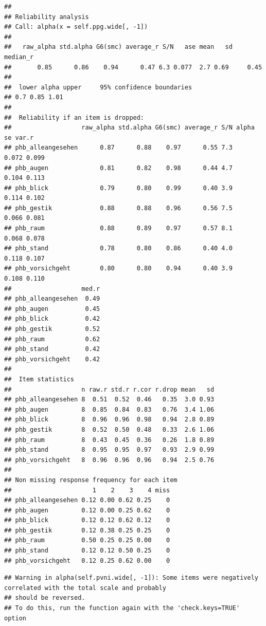 \documentclass[
  english,
  man,floatsintext]{apa6}
\begin{document}
\begin{verbatim}
## 
## Reliability analysis   
## Call: alpha(x = self.ppg.wide[, -1])
## 
##   raw_alpha std.alpha G6(smc) average_r S/N   ase mean   sd median_r
##       0.85      0.86    0.94      0.47 6.3 0.077  2.7 0.69     0.45
## 
##  lower alpha upper     95% confidence boundaries
## 0.7 0.85 1.01 
## 
##  Reliability if an item is dropped:
##                   raw_alpha std.alpha G6(smc) average_r S/N alpha se var.r
## phb_alleangesehen      0.87      0.88    0.97      0.55 7.3    0.072 0.099
## phb_augen              0.81      0.82    0.98      0.44 4.7    0.104 0.113
## phb_blick              0.79      0.80    0.99      0.40 3.9    0.114 0.102
## phb_gestik             0.88      0.88    0.96      0.56 7.5    0.066 0.081
## phb_raum               0.88      0.89    0.97      0.57 8.1    0.068 0.078
## phb_stand              0.78      0.80    0.86      0.40 4.0    0.118 0.107
## phb_vorsichgeht        0.80      0.80    0.94      0.40 3.9    0.108 0.110
##                   med.r
## phb_alleangesehen  0.49
## phb_augen          0.45
## phb_blick          0.42
## phb_gestik         0.52
## phb_raum           0.62
## phb_stand          0.42
## phb_vorsichgeht    0.42
## 
##  Item statistics 
##                   n raw.r std.r r.cor r.drop mean   sd
## phb_alleangesehen 8  0.51  0.52  0.46   0.35  3.0 0.93
## phb_augen         8  0.85  0.84  0.83   0.76  3.4 1.06
## phb_blick         8  0.96  0.96  0.98   0.94  2.8 0.89
## phb_gestik        8  0.52  0.50  0.48   0.33  2.6 1.06
## phb_raum          8  0.43  0.45  0.36   0.26  1.8 0.89
## phb_stand         8  0.95  0.95  0.97   0.93  2.9 0.99
## phb_vorsichgeht   8  0.96  0.96  0.96   0.94  2.5 0.76
## 
## Non missing response frequency for each item
##                      1    2    3    4 miss
## phb_alleangesehen 0.12 0.00 0.62 0.25    0
## phb_augen         0.12 0.00 0.25 0.62    0
## phb_blick         0.12 0.12 0.62 0.12    0
## phb_gestik        0.12 0.38 0.25 0.25    0
## phb_raum          0.50 0.25 0.25 0.00    0
## phb_stand         0.12 0.12 0.50 0.25    0
## phb_vorsichgeht   0.12 0.25 0.62 0.00    0
\end{verbatim}

\begin{verbatim}
## Warning in alpha(self.pvni.wide[, -1]): Some items were negatively correlated with the total scale and probably 
## should be reversed.  
## To do this, run the function again with the 'check.keys=TRUE' option
\end{verbatim}
\end{document}
